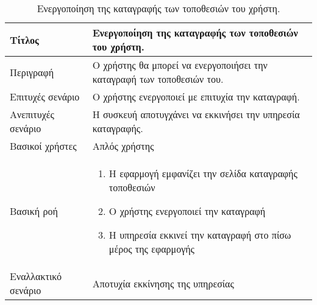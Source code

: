 \begin{table}[h]
 \caption{Ενεργοποίηση της καταγραφής των τοποθεσιών του χρήστη.}
\begin{center}
\begin{tabular}{ | m{10em} |  m{25em} | } 
\hline
 Τίτλος & Ενεργοποίηση της καταγραφής των τοποθεσιών του χρήστη. \\ 
\hline
 Περιγραφή & Ο χρήστης θα μπορεί να ενεργοποιήσει την καταγραφή των τοποθεσιών του. \\ 
\hline
 Επιτυχές σενάριο & Ο χρήστης ενεργοποιεί με επιτυχία την καταγραφή.\\
\hline
 Ανεπιτυχές σενάριο  & Η συσκευή αποτυγχάνει να εκκινήσει την υπηρεσία καταγραφής. \\ 
\hline
 Βασικοί χρήστες  & Απλός χρήστης \\ 
\hline
 Βασική ροή  & 
\begin{enumerate}
\item Η εφαρμογή εμφανίζει την σελίδα καταγραφής τοποθεσιών
\item Ο χρήστης ενεργοποιεί την καταγραφή
\item Η υπηρεσία εκκινεί την καταγραφή στο πίσω μέρος της εφαρμογής
\end{enumerate}
 \\ 
\hline
 Εναλλακτικό σενάριο  & Αποτυχία εκκίνησης της υπηρεσίας  \\ 
\hline
\end{tabular}
\end{center}
\end{table}


